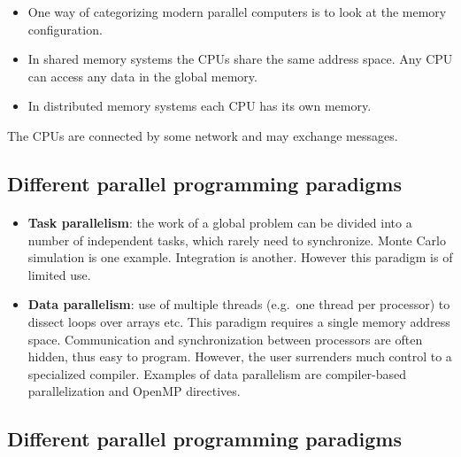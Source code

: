 \documentclass[%
twoside,                 %
final,                   %
10pt]{article}
\begin{document}
\begin{itemize}
\item One way of categorizing modern parallel computers is to look at the memory configuration.

\item In shared memory systems the CPUs share the same address space. Any CPU can access any data in the global memory.

\item In distributed memory systems each CPU has its own memory.
\end{itemize}

\noindent
The CPUs are connected by some network and may exchange
messages.



\subsection{Different parallel programming paradigms}

\paragraph{}

\begin{itemize}
\item \textbf{Task parallelism}:  the work of a global problem can be divided into a number of independent tasks, which rarely need to synchronize.  Monte Carlo simulation is one example. Integration is another. However this paradigm is of limited use.

\item \textbf{Data parallelism}:  use of multiple threads (e.g.~one thread per processor) to dissect loops over arrays etc.  This paradigm requires a single memory address space.  Communication and synchronization between processors are often hidden, thus easy to program. However, the user surrenders much control to a specialized compiler. Examples of data parallelism are compiler-based parallelization and OpenMP directives. 
\end{itemize}

\noindent


\subsection{Different parallel programming paradigms}
\end{document}
